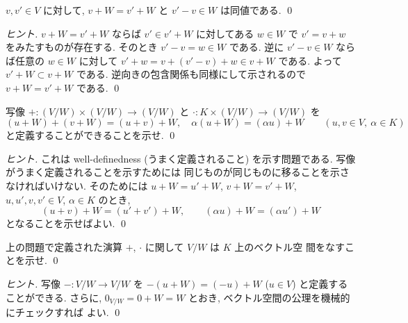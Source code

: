 \documentclass[12pt,twoside]{jarticle}
\begin{document}

\begin{question}[5点]
  \label{q:v+W}
  $v,v'\in V$ に対して, $v+W=v'+W$ と $v'-v\in W$ は同値である. \qed
\end{question}

\begin{proof}[ヒント]
  $v+W=v'+W$ ならば $v'\in v'+W$ に対してある $w\in W$ で $v'=v+w$ 
  をみたすものが存在する.  そのとき $v'-v=w\in W$ である.
  逆に $v'-v\in W$ ならば任意の $w\in W$ に対して %
  $v'+w=v+(v'-v)+w\in v+W$ である. よって $v'+W\subset v+W$ である.
  逆向きの包含関係も同様にして示されるので $v+W=v'+W$ である.
  \qed
\end{proof}


\begin{question}[5点]
  写像 $+:(V/W)\times(V/W)\to(V/W)$ と $\cdot:K\times(V/W)\to(V/W)$ を
  \begin{equation*}
    (u+W)+(v+W) = (u+v)+W, \quad
    \alpha(u+W) = (\alpha u)+W
    \qquad (u,v\in V,\ \alpha\in K)
  \end{equation*}
  と定義することができることを示せ. \qed
\end{question}

\begin{proof}[ヒント]
  これは well-definedness (うまく定義されること) を示す問題である.
  写像がうまく定義されることを示すためには
  同じものが同じものに移ることを示さなければいけない.
  そのためには $u+W=u'+W$, $v+W=v'+W$, $u,u',v,v'\in V$, $\alpha\in K$ のとき,
  \begin{equation*}
    (u+v)+W = (u'+v')+W, \qquad (\alpha u)+W = (\alpha u')+W
  \end{equation*}
  となることを示せばよい.  \qed
\end{proof}


\begin{question}[5点]
  上の問題で定義された演算 $+$, $\cdot$ に関して $V/W$ は $K$ 上のベクトル空
  間をなすことを示せ. 
  \qed
\end{question}

\begin{proof}[ヒント]
  写像 $-:V/W\to V/W$ を $-(u+W)=(-u)+W$ ($u\in V$) と定義することができる.
  さらに, $0_{V/W}=0+W=W$ とおき, ベクトル空間の公理を機械的にチェックすれば
  よい.
  \qed
\end{proof}
\end{document}
